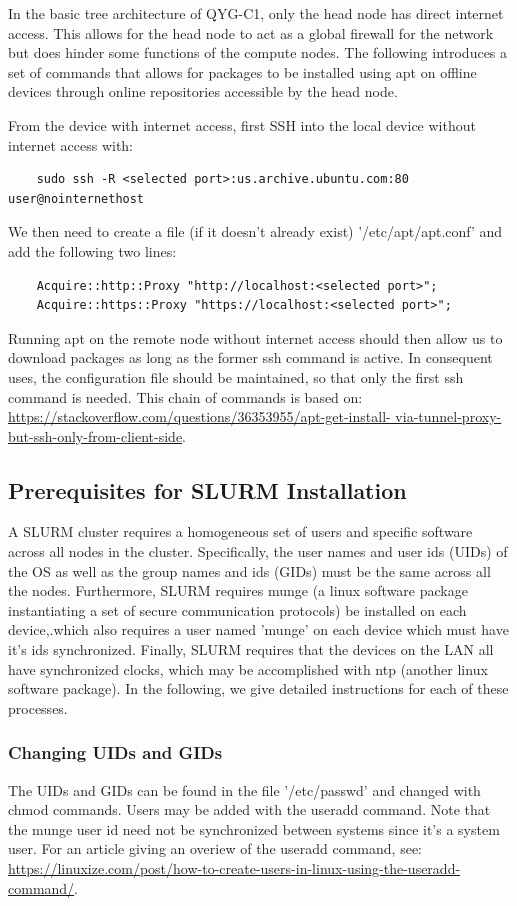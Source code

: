 \documentclass[]{article}
\begin{document}
In the basic tree architecture of QYG-C1, only the head node has direct internet access. This allows for the head node to act as a global firewall for the network but does hinder some functions of the compute nodes. The following introduces a set of commands that allows for packages to be installed using apt on offline devices through online repositories accessible by the head node.

From the device with internet access, first SSH into the local device without internet access with:

\begin{verbatim}
	sudo ssh -R <selected port>:us.archive.ubuntu.com:80 user@nointernethost
\end{verbatim}
We then need to create a file (if it doesn't already exist) '/etc/apt/apt.conf' and add the following two lines:
\begin{verbatim}
	Acquire::http::Proxy "http://localhost:<selected port>";
	Acquire::https::Proxy "https://localhost:<selected port>";
\end{verbatim}
Running apt on the remote node without internet access should then allow us to download packages as long as the former ssh command is active. In consequent uses, the configuration file should be maintained, so that only the first ssh command is needed.
This chain of commands is based on: \url{https://stackoverflow.com/questions/36353955/apt-get-install- via-tunnel-proxy-but-ssh-only-from-client-side}. 

\subsection{Prerequisites for SLURM Installation}

A SLURM cluster requires a homogeneous set of users and specific software across all nodes in the cluster. Specifically, the user names and user ids (UIDs) of the OS as well as the group names and ids (GIDs) must be the same across all the nodes. Furthermore, SLURM requires munge (a linux software package instantiating a set of secure communication protocols) be installed on each device,.which also requires a user named 'munge' on each device which must have it's ids synchronized. Finally, SLURM requires that the devices on the LAN all have synchronized clocks, which may be accomplished with ntp (another linux software package). In the following, we give detailed instructions for each of these processes.

\subsubsection{Changing UIDs and GIDs}
The UIDs and GIDs can be found in the file '/etc/passwd' and changed with chmod commands. Users may be added with the useradd command. Note that the munge user id need not be synchronized between systems since it's a system user. 
For an article giving an overiew of the useradd command, see:
\url{https://linuxize.com/post/how-to-create-users-in-linux-using-the-useradd-command/}.
\end{document}

